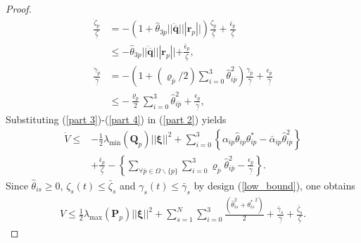 \begin{proof}
	\begin{align}
	\frac{\dot{\zeta}_{ p}}{\underline{\zeta}} &=   - \left(1 + \hat{\theta}_{3p} || \ddot{\overline{\mathbf q}} || | \mathbf{r}_p || \right) \frac{{\zeta}_{p}}{\underline{\zeta} } +  \frac{\bar{\epsilon}_{ p}}{\underline{\zeta} }  \nonumber\\ 
	& \leq   - \hat{\theta}_{3p} || \ddot{\overline{\mathbf q}} || | \mathbf{r}_p ||  +  \frac{\bar{\epsilon}_{ p}}{\underline{\zeta} }, \label{part 4_1}\\
	\frac{\dot{\gamma}_{\overline p}}{\underline{\gamma}} &=   - \left(1 + (\varrho_{\overline{p}}/2) \sum_{i=0}^{3}{\hat{\theta}}_{i \overline p}^2   \right) \frac{{\gamma}_{\overline p}}{\underline{\gamma} } +  \frac{{\epsilon}_{\overline p}}{\underline{\gamma} } \nonumber\\ 
	& \leq   - \frac{\varrho_{\overline{p}}}{2} \sum_{i=0}^{3}{\hat{\theta}}_{i \overline p}^2  +  \frac{{\epsilon}_{\overline p}}{\underline{\gamma} }, \label{part 4} 
	\end{align}
	Substituting (\ref{part 3})-(\ref{part 4}) in (\ref{part 2}) yields
	\begin{align}
	\dot{V}\leq &   - \frac{1}{2} \lambda_{\min}(\mathbf Q_p) || \boldsymbol{\xi} ||^2  +\sum_{i=0}^{3} \left \lbrace\alpha_{ip}{\hat{\theta}}_{ip}{\theta}_{ip}^{*} -\bar{\alpha}_{ip}{\hat{\theta}}_{ip}^2 \right  \rbrace \nonumber\\
	&+\frac{\bar{\epsilon}_{ p}}{\underline{\zeta} }  - \left\lbrace \sum_{\forall \overline{p}\in \Omega \backslash \lbrace p \rbrace} \sum_{i=0}^{3} \varrho_{\overline{p}} {\hat{\theta}}_{i \overline p}^2  -  \frac{{\epsilon}_{\overline p}}{\underline{\gamma} } \right \rbrace. \label{part 5}
	\end{align}
	Since $\hat{\theta}_{is} \geq 0$, $\zeta_{s}(t) \leq \bar{\zeta}_{s}$ and $\gamma_{s}(t) \leq \bar{\gamma}_{s}$ by design (\ref{low_bound}), one obtains
	\begin{align}
	V \leq  \frac{1}{2} \lambda_{\max}( \mathbf{P}_{p} ) ||\boldsymbol{\xi}||^2  + \sum_{s=1}^{N} \sum_{i=0}^{3}\frac{(\hat{\theta}_{is}^2 + {\theta_{is}^{*}}^2)}{2}+ \frac{\bar{\gamma}_{s}}{ \underline{\gamma}}+ \frac{\bar{\zeta}_{s}}{ \underline{\zeta}}. \label{lyap_up_bound}
	\end{align}

\end{proof}
